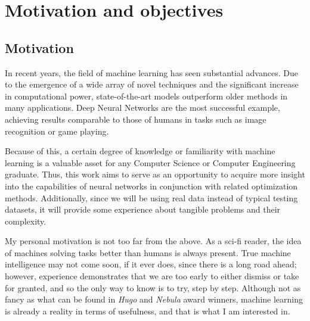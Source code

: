 \chapter{Motivation and objectives}\label{ch:objectives} 

\section{Motivation}

	In recent years, the field of machine learning has seen substantial advances. Due to the emergence of a wide array of novel techniques and the significant increase in computational power, state-of-the-art models outperform older methods in many applications. Deep Neural Networks are the most successful example, achieving results comparable to those of humans in tasks such as image recognition or game playing.

	Because of this, a certain degree of knowledge or familiarity with machine learning is a valuable asset for any Computer Science or Computer Engineering graduate. Thus, this work aims to serve as an opportunity to acquire more insight into the capabilities of neural networks in conjunction with related optimization methods. Additionally, since we will be using real data instead of typical testing datasets, it will provide some experience about tangible problems and their complexity.

	My personal motivation is not too far from the above. As a sci-fi reader, the idea of machines solving tasks better than humans is always present. True machine intelligence may not come soon, if it ever does, since there is a long road ahead; however, experience demonstrates that we are too early to either dismiss or take for granted, and so the only way to know is to try, step by step. Although not as fancy as what can be found in \textit{Hugo} and \textit{Nebula} award winners, machine learning is already a reality in terms of usefulness, and that is what I am interested in.